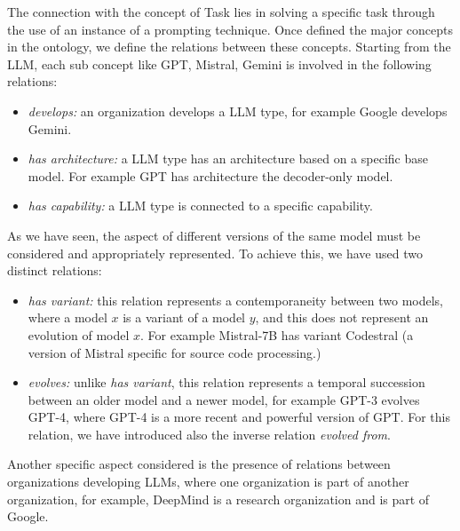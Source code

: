 The connection with the concept of Task lies in solving a specific task through the use of an instance of a prompting technique.
Once defined the major concepts in the ontology, we define the relations between these concepts.
Starting from the LLM, each sub concept like GPT, Mistral, Gemini is involved in the following relations:
\begin{itemize}
    \item \textit{develops:} an organization develops a LLM type, for example Google develops Gemini.

    \item \textit{has architecture:} a LLM type has an architecture based on a specific base model. For example GPT has architecture the decoder-only model.
    
    \item \textit{has capability:} a LLM type is connected to a specific capability.
\end{itemize}
As we have seen, the aspect of different versions of the same model must be considered and appropriately represented.
To achieve this, we have used two distinct relations:
\begin{itemize}
    \item \textit{has variant:} this relation represents a contemporaneity between two models, where a model $x$ is a variant of a model $y$, and this does not represent an evolution of model $x$. For example Mistral-7B has variant Codestral (a version of Mistral specific for source code processing.)

    \item \textit{evolves:} unlike \textit{has variant}, this relation represents a temporal succession between an older model and a newer model, for example GPT-3 evolves GPT-4, where GPT-4 is a more recent and powerful version of GPT. For this relation, we have introduced also the inverse relation \textit{evolved from}.
\end{itemize}
Another specific aspect considered is the presence of relations between organizations developing LLMs, where one organization is part of another organization, for example, DeepMind is a research organization and is part of Google.
